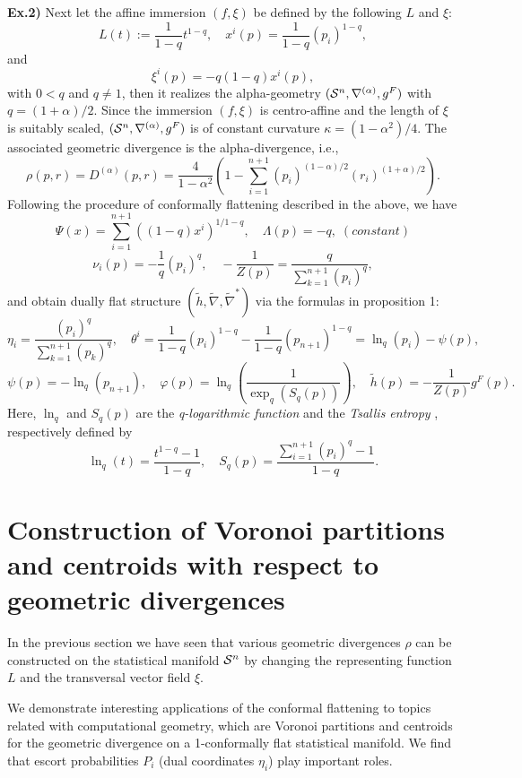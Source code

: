 \documentclass{llncs}
\begin{document}
\noindent
{\bf Ex.2)} Next let the affine immersion $(f,\xi)$ be defined by 
the following $L$ and $\xi$:
\[
	L(t):=\frac{1}{1-q}t^{1-q}, \quad x^i(p)=\frac{1}{1-q}(p_i)^{1-q},
\]
and
\[
	\xi^i(p)=-q(1-q)x^i(p),
\]
with $0 <q$ and $q \not=1$, 
then it realizes the alpha-geometry \cite{AN}
$({\cal S}^n,\nabla^{(\alpha)}, g^F)$ with $q=(1+\alpha)/2$.
Since the immersion $(f, \xi)$ is centro-affine and the length of 
$\xi$ is suitably scaled, $({\cal S}^n,\nabla^{(\alpha)}, g^F)$ 
is of constant curvature $\kappa=(1-\alpha^2)/4$.
The associated geometric divergence is the alpha-divergence, i.e.,
\begin{equation}
	\rho(p,r)=D^{(\alpha)}(p,r)=\frac{4}{1-\alpha^2}
	\left(
	1-\sum_{i=1}^{n+1}(p_i)^{(1-\alpha)/2}(r_i)^{(1+\alpha)/2}
	\right).
\label{alpha_div}
\end{equation}
Following the procedure of conformally flattening  
described in the above, we have \cite{OMA10}
\[
	\Psi(x)=\sum_{i=1}^{n+1} ((1-q)x^i)^{1/{1-q}},
	\quad \Lambda(p)=-q, \; (constant) 
\]
\[
	\nu_i(p)=-\frac{1}{q}(p_i)^{q}, \quad 
	-\frac{1}{Z(p)}=\frac{q}{\sum_{k=1}^{n+1} (p_i)^q},
\]
and obtain dually flat structure 
$(\tilde h, \tilde \nabla, \tilde \nabla^*)$
via the formulas in proposition 1:
\[
	\eta_i=\frac{(p_i)^{q}}{\sum_{k=1}^{n+1}(p_k)^{q}}, \quad
	\theta^i=\frac{1}{1-q}(p_i)^{1-q} - \frac{1}{1-q}(p_{n+1})^{1-q}
	=\ln_q(p_i)-\psi(p),
\]
\[
	\psi(p)=-\ln_q(p_{n+1}), \quad 
	\varphi(p)=\ln_q \left( \frac{1}{\exp_q (S_q(p))} \right), \quad
	\tilde h(p)=-\frac{1}{Z(p)}g^F(p).
\]
Here, $\ln_q$ and $S_q(p)$ are the {\em q-logarithmic function} and 
the {\em Tsallis entropy} \cite{Tsallis09}, respectively defined by
\[
	\ln_q(t)=\frac{t^{1-q}-1}{1-q}, \quad 
		S_q(p)=\frac{\sum_{i=1}^{n+1}(p_i)^q -1}{1-q}.
\]

\section{Construction of Voronoi partitions 
and centroids with respect to geometric divergences}
In the previous section we have seen that various geometric divergences 
$\rho$ can be constructed on the statistical manifold ${\cal S}^n$ 
by changing the representing function $L$ and the transversal vector 
field $\xi$.

We demonstrate interesting applications of the conformal flattening to 
topics related with computational geometry, 
which are Voronoi partitions and centroids for the geometric divergence 
on a 1-conformally flat statistical manifold.
We find that escort probabilities $P_i$ (dual coordinates $\eta_i$) 
play important roles. 
\end{document}
